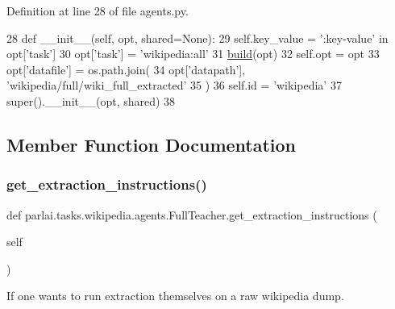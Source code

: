 Definition at line 28 of file agents.\+py.


\begin{DoxyCode}
28     \textcolor{keyword}{def }\_\_init\_\_(self, opt, shared=None):
29         self.key\_value = \textcolor{stringliteral}{':key-value'} \textcolor{keywordflow}{in} opt[\textcolor{stringliteral}{'task'}]
30         opt[\textcolor{stringliteral}{'task'}] = \textcolor{stringliteral}{'wikipedia:all'}
31         \hyperlink{namespaceparlai_1_1mturk_1_1tasks_1_1talkthewalk_1_1download_a8c0fbb9b6dfe127cb8c1bd6e7c4e33fd}{build}(opt)
32         self.opt = opt
33         opt[\textcolor{stringliteral}{'datafile'}] = os.path.join(
34             opt[\textcolor{stringliteral}{'datapath'}], \textcolor{stringliteral}{'wikipedia/full/wiki\_full\_extracted'}
35         )
36         self.id = \textcolor{stringliteral}{'wikipedia'}
37         super().\_\_init\_\_(opt, shared)
38 
\end{DoxyCode}


\subsection{Member Function Documentation}
\mbox{\label{classparlai_1_1tasks_1_1wikipedia_1_1agents_1_1FullTeacher_a37c660b0fdaba618690bfde0eb425ccf}} 
\subsubsection{\texorpdfstring{get\+\_\+extraction\+\_\+instructions()}{get\_extraction\_instructions()}}
{\footnotesize\ttfamily def parlai.\+tasks.\+wikipedia.\+agents.\+Full\+Teacher.\+get\+\_\+extraction\+\_\+instructions (\begin{DoxyParamCaption}\item[{}]{self }\end{DoxyParamCaption})}

\begin{DoxyVerb}If one wants to run extraction themselves on a raw wikipedia dump.
\end{DoxyVerb}
 

